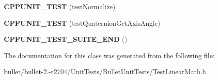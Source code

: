 \begin{DoxyCompactItemize}
\item 
\hypertarget{class_test_linear_math_af14e8efbac045bfdc2e7364b1ff217ff}{{\bfseries C\+P\+P\+U\+N\+I\+T\+\_\+\+T\+E\+S\+T} (test\+Normalize)}\label{class_test_linear_math_af14e8efbac045bfdc2e7364b1ff217ff}

\item 
\hypertarget{class_test_linear_math_a33f7de9321adcd646c9af6516e5e1ac8}{{\bfseries C\+P\+P\+U\+N\+I\+T\+\_\+\+T\+E\+S\+T} (test\+Quaternion\+Get\+Axis\+Angle)}\label{class_test_linear_math_a33f7de9321adcd646c9af6516e5e1ac8}

\item 
\hypertarget{class_test_linear_math_a6ecd1bb2e55874150e310db6b15981c0}{{\bfseries C\+P\+P\+U\+N\+I\+T\+\_\+\+T\+E\+S\+T\+\_\+\+S\+U\+I\+T\+E\+\_\+\+E\+N\+D} ()}\label{class_test_linear_math_a6ecd1bb2e55874150e310db6b15981c0}

\end{DoxyCompactItemize}


The documentation for this class was generated from the following file\+:\begin{DoxyCompactItemize}
\item 
bullet/bullet-\/2.-\/r2704/\+Unit\+Tests/\+Bullet\+Unit\+Tests/Test\+Linear\+Math.\+h\end{DoxyCompactItemize}
